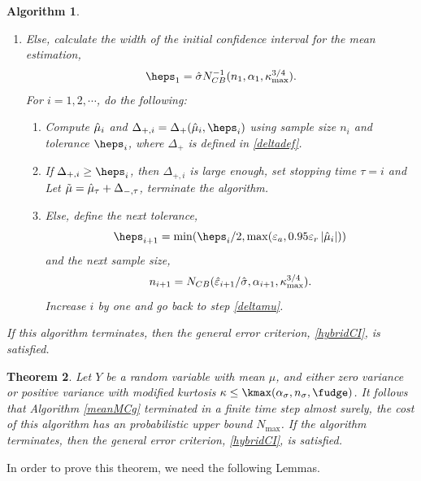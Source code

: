 \documentclass{iitthesis}
\newtheorem{theorem}{Theorem}[section]
\newtheorem{algorithm}[theorem]{Algorithm}
\begin{document}
\begin{algorithm}
\begin{enumerate}
$$n = N_{CB}(\varepsilon_a/\hsigma,\alpha_1,\kappa_{\max}^{3/4}).$$ Then, compute $\tmu$ using $n$ samples, terminate the algorithm.
\item Else, calculate the width of the initial confidence interval for the mean estimation,
\begin{align}\label{eps1def}
\heps_1=\hsigma N_{CB}^{-1}(n_1,\alpha_1,\kappa_{\max}^{3/4}).
\end{align}
For $i = 1,2,\cdots$, do the following:
\begin{enumerate}
\item  \label{deltamu}Compute $\hat{\mu}_i$ and $\Delta_{+,i}=\Delta_{+}(\hmu_i,\heps_i)$ using sample size $n_i$ and tolerance $\heps_i$, where $\Delta_{+}$ is defined in \eqref{deltadef}.
\item If $\Delta_{+,i} \geq  \heps_i$, then $\Delta_{+,i}$ is large enough, set stopping time $\tau = i$ and Let $\tilde{\mu} = \hat{\mu}_{\tau}+\Delta_{-, \tau}$, terminate the algorithm.
\item Else, define the next tolerance, $$\heps_{i+1} = \min(\heps_i/2, \max(\varepsilon_a,0.95\varepsilon_r\abs{\hmu_i}))$$ and the next sample size, $$n_{i+1} = N_{CB}(\hat{\varepsilon}_{i+1}/\hat{\sigma},\alpha_{i+1},\kappa_{\max}^{3/4}).$$ Increase $i$ by one and go back to step \ref{deltamu}. 
\end{enumerate}
\end{enumerate}
If this algorithm terminates, then the general error criterion, \eqref{hybridCI}, is satisfied.
\end{algorithm}

\begin{theorem}\label{hybriderrthm}
Let $Y$ be a random variable with mean $\mu$, and either zero variance or positive variance with modified kurtosis $\kappa \leq \kmax(\alpha_\sigma, n_\sigma, \fudge)$. It follows that Algorithm \ref{meanMCg} terminated in a finite time step almost surely, the cost of this algorithm has an probabilistic upper bound $N_{\max}$. If the algorithm terminates, then the general error criterion, \eqref{hybridCI}, is satisfied.
\end{theorem}
In order to prove this theorem, we need the following Lemmas.
\end{document}
